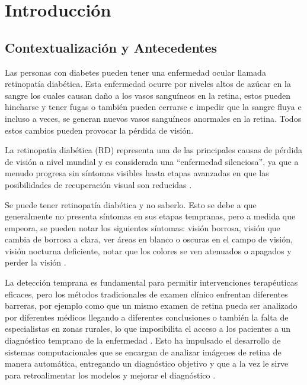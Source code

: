 \section{Introducción}

\subsection{Contextualización y Antecedentes}

Las personas con diabetes pueden tener una enfermedad ocular llamada retinopatía diabética. Esta enfermedad ocurre por niveles altos de azúcar en la sangre los cuales causan daño a los vasos sanguíneos en la retina, estos pueden hincharse y tener fugas o también pueden cerrarse e impedir que la sangre fluya e incluso a veces, se generan nuevos vasos sanguíneos anormales en la retina. Todos estos cambios pueden provocar la pérdida de visión.

La retinopatía diabética (RD) representa una de las principales causas de pérdida de visión a nivel mundial y es considerada una ``enfermedad silenciosa'', ya que a menudo progresa sin síntomas visibles hasta etapas avanzadas en que las posibilidades de recuperación visual son reducidas \parencite{casanova2014application}. 

Se puede tener retinopatía diabética y no saberlo. Esto se debe a que generalmente no presenta síntomas en sus etapas tempranas, pero a medida que empeora, se pueden notar los siguientes síntomas: visión borrosa, visión que cambia de borrosa a clara, ver áreas en blanco o oscuras en el campo de visión, visión nocturna deficiente, notar que los colores se ven atenuados o apagados y perder la visión \parencite{aao2024retinopatia}.

La detección temprana es fundamental para permitir intervenciones terapéuticas eficaces, pero los métodos tradicionales de examen clínico enfrentan diferentes barreras, por ejemplo como que un mismo examen de retina pueda ser analizado por diferentes médicos llegando a diferentes conclusiones o también la falta de especialistas en zonas rurales, lo que imposibilita el acceso a los pacientes a un diagnóstico temprano de la enfermedad \parencite{casanova2014application}. Esto ha impulsado el desarrollo de sistemas computacionales que se encargan de analizar imágenes de retina de manera automática, entregando un diagnóstico objetivo y que a la vez le sirve para retroalimentar los modelos y mejorar el diagnóstico \parencite{antal2014ensemble}.

